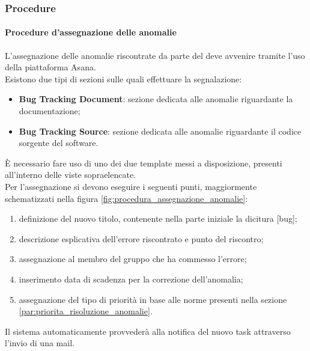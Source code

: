 		\subsubsection{Procedure}
		\label{ssub:procedure}

			\paragraph{Procedure d'assegnazione delle anomalie}
			\label{par:Procedure_assegnazione_delle_anomalie}
			L'assegnazione delle anomalie riscontrate da parte del \roleVerifier{} deve avvenire tramite l'uso della piattaforma Asana.\\
			Esistono due tipi di sezioni sulle quali effettuare la segnalazione:
			\begin{itemize}
				\item \textbf{Bug Tracking Document}: sezione dedicata alle anomalie riguardante la documentazione; 
				\item \textbf{Bug Tracking Source}: sezione dedicata alle anomalie riguardante il codice sorgente del software.
			\end{itemize}
			\noindent
			\`E necessario fare uso di uno dei due template messi a disposizione, presenti all'interno delle viste sopraelencate.\\
			Per l'assegnazione si devono eseguire i seguenti punti, maggiormente schematizzati nella figura \ref{fig:procedura_assegnazione_anomalie}:
			\begin{enumerate}
				\item definizione del nuovo titolo, contenente nella parte iniziale la dicitura {[}bug{]};
				\item descrizione esplicativa dell'errore riscontrato e punto del riscontro;
				\item assegnazione al membro del gruppo che ha commesso l'errore;
				\item inserimento data di scadenza per la correzione dell'anomalia;
				\item assegnazione del tipo di priorità in base alle norme presenti nella sezione \ref{par:priorita_risoluzione_anomalie}.
			\end{enumerate}
			\noindent
			Il sistema automaticamente provvederà alla notifica del nuovo task attraverso l'invio di una mail.
